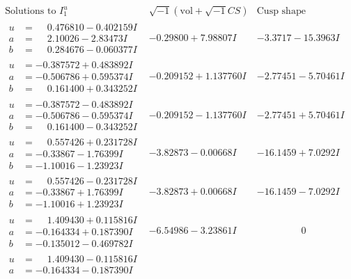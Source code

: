 \documentclass[1p]{elsarticle_modified}
\theoremstyle{definition}
\newcommand{\I}{\sqrt{-1}}
\begin{document}
$$\begin{array}{c|c|c}
\text{Solutions to }I^u_{1}& \I (\text{vol} + \sqrt{-1}CS) & \text{Cusp shape}\\
 \hline 
\begin{aligned}
u &= \phantom{-}0.476810 - 0.402159 I \\
a &= \phantom{-}2.10026 - 2.83473 I \\
b &= \phantom{-}0.284676 - 0.060377 I\end{aligned}
 & -0.29800 + 7.98807 I & -3.3717 - 15.3963 I \\ \hline\begin{aligned}
u &= -0.387572 + 0.483892 I \\
a &= -0.506786 + 0.595374 I \\
b &= \phantom{-}0.161400 + 0.343252 I\end{aligned}
 & -0.209152 + 1.137760 I & -2.77451 - 5.70461 I \\ \hline\begin{aligned}
u &= -0.387572 - 0.483892 I \\
a &= -0.506786 - 0.595374 I \\
b &= \phantom{-}0.161400 - 0.343252 I\end{aligned}
 & -0.209152 - 1.137760 I & -2.77451 + 5.70461 I \\ \hline\begin{aligned}
u &= \phantom{-}0.557426 + 0.231728 I \\
a &= -0.33867 - 1.76399 I \\
b &= -1.10016 - 1.23923 I\end{aligned}
 & -3.82873 - 0.00668 I & -16.1459 + 7.0292 I \\ \hline\begin{aligned}
u &= \phantom{-}0.557426 - 0.231728 I \\
a &= -0.33867 + 1.76399 I \\
b &= -1.10016 + 1.23923 I\end{aligned}
 & -3.82873 + 0.00668 I & -16.1459 - 7.0292 I \\ \hline\begin{aligned}
u &= \phantom{-}1.409430 + 0.115816 I \\
a &= -0.164334 + 0.187390 I \\
b &= -0.135012 - 0.469782 I\end{aligned}
 & -6.54986 - 3.23861 I & \phantom{-0.000000 } 0 \\ \hline\begin{aligned}
u &= \phantom{-}1.409430 - 0.115816 I \\
a &= -0.164334 - 0.187390 I \\

\end{aligned}
\end{array}$$
\end{document}

